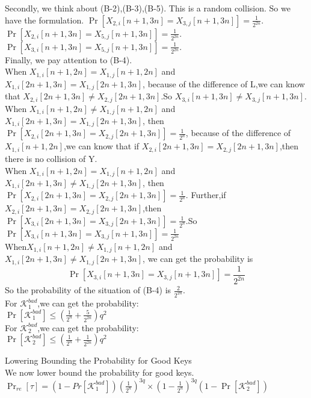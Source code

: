 Secondly, we think about (B-2),(B-3),(B-5). This is a random collision.
So we have the formulation.
$\Pr[X_{2,i}[n+1,3n]=X_{3,j}[n+1,3n]]=\frac{1}{2^{2n}}$.\\
$\Pr[X_{2,i}[n+1,3n]=X_{5,j}[n+1,3n]]=\frac{1}{2^{2n}}$.\\
$\Pr[X_{3,i}[n+1,3n]=X_{5,j}[n+1,3n]]=\frac{1}{2^{2n}}$.\\

Finally, we pay attention to (B-4).\\
When $X_{1,i}[n+1,2n]=X_{1,j}[n+1,2n]$ and $X_{1,i}[2n+1,3n]=X_{1,j}[2n+1,3n]$, because of the difference of L,we can know that $X_{2,i}[2n+1,3n]\neq X_{2,j}[2n+1,3n]$.So $X_{3,i}[n+1,3n]\neq X_{3,j}[n+1,3n]$. \\
When $X_{1,i}[n+1,2n]\neq X_{1,j}[n+1,2n]$ and $X_{1,i}[2n+1,3n]=X_{1,j}[2n+1,3n]$, then $\Pr[X_{2,i}[2n+1,3n]=X_{2,j}[2n+1,3n]]=\frac{1}{2^{n}}$, because of the difference of $X_{1,i}[n+1,2n]$,we can know that if $X_{2,i}[2n+1,3n]=X_{2,j}[2n+1,3n]$,then there is no collision of Y.\\
When $X_{1,i}[n+1,2n]=X_{1,j}[n+1,2n]$ and $X_{1,i}[2n+1,3n]\neq X_{1,j}[2n+1,3n]$, then $\Pr[X_{2,i}[2n+1,3n]=X_{2,j}[2n+1,3n]]=\frac{1}{2^{n}}$. Further,if $X_{2,i}[2n+1,3n]=X_{2,j}[2n+1,3n]$,then $\Pr[X_{3,i}[2n+1,3n]=X_{3,j}[2n+1,3n]]=\frac{1}{2^{n}}$.So $\Pr[X_{3,i}[n+1,3n]=X_{3,j}[n+1,3n]]=\frac{1}{2^{2n}}$\\
When$X_{1,i}[n+1,2n]\neq X_{1,j}[n+1,2n]$ and $X_{1,i}[2n+1,3n]\neq X_{1,j}[2n+1,3n]$, we can get the probability is $$\Pr[X_{3,i}[n+1,3n]=X_{3,j}[n+1,3n]]=\frac{1}{2^{2n}}$$
So the probability of the situation of (B-4) is $\frac{2}{2^{2n}}$.\\
For $\mathcal{K}_{1}^{bad}$,we can get the probability:\\
$\Pr[\mathcal{K}_{1}^{bad}]\leq (\frac{1}{2^{n}}+\frac{5}{2^{2n}})q^{2}$\\

For $\mathcal{K}_{2}^{bad}$,we can get the probability:\\
$\Pr[\mathcal{K}_{2}^{bad}]\leq (\frac{1}{2^{n}}+\frac{1}{2^{2n}})q^{2}$

Lowering Bounding the Probability for Good Keys\\
We now lower bound the probability for good keys.\\
$\Pr_{re}[\tau]=(1-Pr[\mathcal{K}_{1}^{bad}])(\frac{1}{2^{n}})^{3q}\times(1-\frac{1}{2^{n}})^{3q}
(1-\Pr[\mathcal{K}_{2}^{bad}])$

